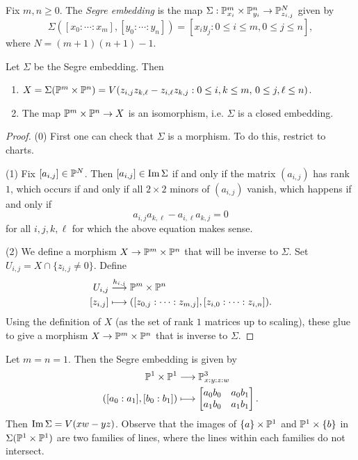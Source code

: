 \begin{definition}
  Fix $m, n \ge 0$. The
  \emph{Segre embedding} is
  the map $\Sigma : \mathbb{P}_{x_i}^m \times \mathbb{P}_{y_i}^n \to \mathbb{P}^N_{z_{i, j}}$
  given by
  \[
    \Sigma([x_0 : \cdots : x_m], [y_0 : \cdots : y_n])
    = [x_i y_j : 0 \le i \le m, 0 \le j \le n],
  \]
  where $N = (m + 1)(n + 1) - 1$.
\end{definition}

\begin{prop}
  Let $\Sigma$ be the Segre embedding.
  Then
  \begin{enumerate}
    \item $X = \Sigma(\mathbb{P}^m \times \mathbb{P}^n) = V(z_{i, j} z_{k, \ell} - z_{i, \ell} z_{k, j} : 0 \le i, k \le m,\, 0 \le j, \ell \le n)$.
    \item The map
      $\mathbb{P}^m \times \mathbb{P}^n \to X$ is an
      isomorphism, i.e. $\Sigma$ is a
      closed embedding.
  \end{enumerate}
\end{prop}

\begin{proof}
  (0) First one can check that
  $\Sigma$ is a morphism.
  To do this, restrict to charts.

  (1) Fix $[a_{i ,j}] \in \mathbb{P}^N$.
  Then $[a_{i, j}] \in \operatorname{Im} \Sigma$
  if and only if the matrix $(a_{i, j})$
  has rank $1$, which occurs if and only
  if all $2 \times 2$ minors of
  $(a_{i, j})$ vanish,
  which happens if and only if
  \[
    a_{i, j} a_{k, \ell} - a_{i, \ell} a_{k, j} = 0
  \]
  for all $i, j, k, \ell$ for which the
  above equation makes sense.

  (2) We define a morphism
  $X \to \mathbb{P}^m \times \mathbb{P}^n$ that will
  be inverse to $\Sigma$. Set
  $U_{i, j} = X \cap \{z_{i, j} \ne 0\}$.
  Define
  \begin{align*}
    U_{i, j}
    &\overset{h_{i, j}}{\longrightarrow}
    \mathbb{P}^m \times \mathbb{P}^n \\
    [z_{i, j}]
    &\longmapsto
    ([z_{0, j} : \cdots : z_{m, j}], [z_{i, 0} : \cdots : z_{i, n}]).
  \end{align*}
  Using the definition of $X$
  (as the set of rank $1$ matrices up
  to scaling), these glue to give a
  morphism $X \to \mathbb{P}^m \times \mathbb{P}^n$
  that is inverse to $\Sigma$.
\end{proof}

\begin{example}
  Let $m = n = 1$. Then the Segre
  embedding is given by
  \begin{align*}
    \mathbb{P}^1 \times \mathbb{P}^1
    &\longrightarrow \mathbb{P}^3_{x : y : z : w} \\
    ([a_0 : a_1], [b_0 : b_1])
    &\longmapsto
    \begin{bmatrix}
      a_0 b_0 & a_0 b_1 \\
      a_1 b_0 & a_1 b_1
    \end{bmatrix}.
  \end{align*}
  Then $\operatorname{Im} \Sigma = V(xw - yz)$. Observe
  that the images of $\{a\} \times \mathbb{P}^1$
  and $\mathbb{P}^1 \times \{b\}$ in
  $\Sigma(\mathbb{P}^1 \times \mathbb{P}^1)$ are two
  families of lines, where the lines within
  each families do not intersect.
\end{example}

